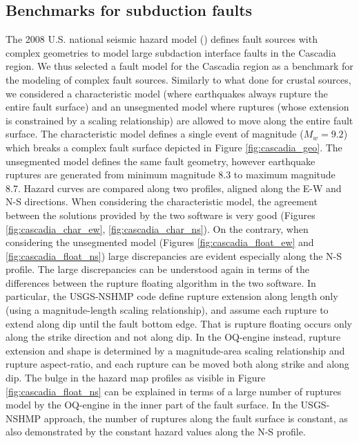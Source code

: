 \subsection{Benchmarks for subduction faults}
The 2008 U.S. national seismic hazard model (\cite{petersen2008}) defines fault sources with complex geometries to model large subdaction interface faults in the Cascadia region. We thus selected a fault model for the Cascadia region as a benchmark for the modeling of complex fault sources. Similarly to what done for crustal sources, we considered a characteristic model (where earthquakes always rupture the entire fault surface) and an unsegmented model where ruptures (whose extension is constrained by a scaling relationship) are allowed to move along the entire fault surface. The characteristic model defines a single event of magnitude ($M_{w}=9.2$) which breaks a complex fault surface depicted in Figure \ref{fig:cascadia_geo}. The unsegmented model defines the same fault geometry, however earthquake ruptures are generated from minimum magnitude 8.3 to maximum magnitude 8.7. Hazard curves are compared along two profiles, aligned along the E-W and N-S directions. When considering the characteristic model, the agreement between the solutions provided by the two software is very good (Figures \ref{fig:cascadia_char_ew}, \ref{fig:cascadia_char_ns}). On the contrary, when considering the unsegmented model (Figures \ref{fig:cascadia_float_ew} and \ref{fig:cascadia_float_ns}) large discrepancies are evident especially along the N-S profile. The large discrepancies can be understood again in terms of the differences between the rupture floating algorithm in the two software. In particular, the USGS-NSHMP code define rupture extension along length only (using a magnitude-length scaling relationship), and assume each rupture to extend along dip until the fault bottom edge. That is rupture floating occurs only along the strike direction and not along dip. In the OQ-engine instead, rupture extension and shape is determined by a magnitude-area scaling relationship and rupture aspect-ratio, and each rupture can be moved both along strike and along dip. The bulge in the hazard map profiles as visible in Figure \ref{fig:cascadia_float_ns} can be explained in terms of a large number of ruptures model by the OQ-engine in the inner part of the fault surface. In the USGS-NSHMP approach, the number of ruptures along the fault surface is constant, as also demonstrated by the constant hazard values along the N-S profile.
